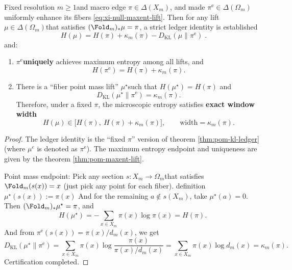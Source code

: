 \begin{theorem}\label{thm:xi-null-fiber-entropy-window}
Fixed resolution \(m\ge 1\) ​​and macro edge \(\pi\in\Delta(X_m)\), and made \(\pi^{\mathrm{e}}\in\Delta(\Omega_m)\) uniformly enhance its fibers \eqref{eq:xi-null-maxent-lift}.
Then for any lift \(\mu\in\Delta(\Omega_m)\) ​​that satisfies \((\Fold_m)_*\mu=\pi\), a strict ledger identity is established
\[
\boxed{\;
H(\mu)=H(\pi)+\kappa_m(\pi)-D_{\mathrm{KL}}(\mu\|\pi^{\mathrm{e}})\; }.
\]
and:
\begin{enumerate}
  \item \(\pi^{\mathrm{e}}\) ​​\textbf {uniquely} achieves maximum entropy among all lifts, and
  \[
  H(\pi^{\mathrm{e}})=H(\pi)+\kappa_m(\pi).
  \]
  \item There is a “fiber point mass lift” \(\mu^\star\) ​​such that \(H(\mu^\star)=H(\pi)\) and
  \[
  D_{\mathrm{KL}}(\mu^\star\|\pi^{\mathrm{e}})=\kappa_m(\pi).
  \]
  Therefore, under a fixed \(\pi\), the microscopic entropy satisfies \textbf{exact window width}
  \[
  H(\mu)\in\bigl[H(\pi),\ H(\pi)+\kappa_m(\pi)\bigr],
  \qquad
  \mathrm{width}=\kappa_m(\pi).
  \]
\end{enumerate}
\end{theorem}

\begin{proof}
The ledger identity is the “fixed \(\pi\)” version of theorem \ref{thm:pom-kl-ledger} (where \(\mu^e\) is denoted as \(\pi^{\mathrm{e}}\)).
The maximum entropy endpoint and uniqueness are given by the theorem \ref{thm:pom-maxent-lift}.
\par
Point mass endpoint: Pick any section \(s:X_m\to\Omega_m\) ​​that satisfies \(\Fold_m(s(x))=x\) (just pick any point for each fiber).
definition
\(
\mu^\star(s(x)):=\pi(x)
\)
And for the remaining \(a\notin s(X_m)\), take \(\mu^\star(a)=0\).
Then \((\Fold_m)_*\mu^\star=\pi\), and
\[
H(\mu^\star)=-\sum_{x\in X_m}\pi(x)\log\pi(x)=H(\pi).
\]
And from \(\pi^{\mathrm{e}}(s(x))=\pi(x)/d_m(x)\), we get
\[
D_{\mathrm{KL}}(\mu^\star\|\pi^{\mathrm{e}})
=\sum_{x\in X_m}\pi(x)\log\frac{\pi(x)}{\pi(x)/d_m(x)}
=\sum_{x\in X_m}\pi(x)\log d_m(x)
=\kappa_m(\pi).
\]
Certification completed.
\end{proof}

